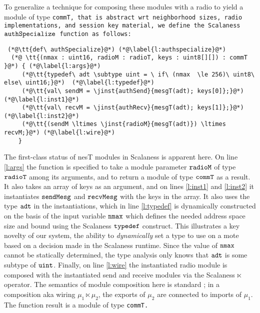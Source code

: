 To generalize a technique for composing these modules with a radio to yield a module of type
\tt{commT}, that is abstract wrt neighborhood sizes, radio implementations, and session key
material, we define the Scalaness $\tt{authSpecialize}$ function as follows:
\lstset{numbers=left, numberstyle=\tiny, firstnumber=19, stepnumber=1,
  numbersep=0pt, basicstyle=\ttfamily}
 {\scriptsize
\begin{lstlisting}
 (*@\tt{def\ authSpecialize}@*) (*@\label{l:authspecialize}@*)
  (*@ \tt{(nmax : uint16, radioM : radioT, keys : uint8[][]) : commT }@*) { (*@\label{l:args}@*)
     (*@\tt{typedef\ adt \subtype uint = \ if\ (nmax  \le 256)\ uint8\ else\ uint16;}@*)  (*@\label{l:typedef}@*) 
     (*@\tt{val\ sendM = \jinst{authSend}{mesgT(adt); keys[0]};}@*)  (*@\label{l:inst1}@*)
     (*@\tt{val\ recvM = \jinst{authRecv}{mesgT(adt); keys[1]};}@*)  (*@\label{l:inst2}@*)    
     (*@\tt{(sendM \ltimes \jinst{radioM}{mesgT(adt)}) \ltimes recvM;}@*) (*@\label{l:wire}@*)
    }
\end{lstlisting}} 

The first-class status of nesT modules in Scalaness is apparent here. On line \ref{l:args} the
function is specified to take a module parameter $\tt{radioM}$ of type $\tt{radioT}$ among its
arguments, and to return a module of type $\tt{commT}$ as a result. It also takes an array of
keys as an argument, and on lines \ref{l:inst1} and \ref{l:inst2} it instantiates
$\tt{sendMesg}$ and $\tt{recvMesg}$ with the keys in the array. It also uses the type $\tt{adt}$
in the instantiations, which in line \ref{l:typedef} is dynamically constructed on the basis of
the input variable $\tt{nmax}$ which defines the needed address space size and bound using the
Scalaness $\tt{typedef}$ construct. This illustrates a key novelty of our system, the ability to
\emph{dynamically} set a type to use on a mote based on a decision made in the Scalaness
runtime. Since the value of $\tt{nmax}$ cannot be statically determined, the type analysis only
knows that $\tt{adt}$ is some subtype of $\tt{uint}$. Finally, on line \ref{l:wire} the
instantiated radio module is composed with the instantiated send and receive modules via the
Scalaness $\ltimes$ operator. The semantics of module composition here is standard
\cite{Cardelli-1997}; in a composition aka wiring $\mu_1 \ltimes \mu_2$, the exports of $\mu_2$
are connected to imports of $\mu_1$. The function result is a module of type \tt{commT}.

